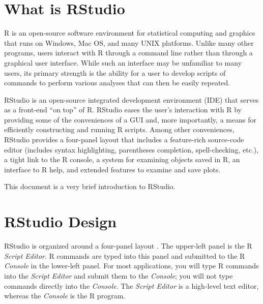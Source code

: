 \documentclass{article}\usepackage[]{graphicx}\usepackage[]{color}
\begin{document}
\section{What is RStudio}
\vspace{-12pt}
R is an open-source software environment for statistical computing and graphics that runs on Windows, Mac OS, and many UNIX platforms.  Unlike many other programs, users interact with R through a command line rather than through a graphical user interface.    While such an interface may be unfamiliar to many users, its primary strength is the ability for a user to develop scripts of commands to perform various analyses that can then be easily repeated.

RStudio is an open-source integrated development environment (IDE) that serves as a front-end ``on top'' of R.  RStudio eases the user's interaction with R by providing some of the conveniences of a GUI and, more importantly, a means for efficiently constructing and running R scripts.  Among other conveniences, RStudio provides a four-panel layout that includes a feature-rich source-code editor (includes syntax highlighting, parentheses completion, spell-checking, etc.), a tight link to the R console, a system for examining objects saved in R, an interface to R help, and extended features to examine and save plots.

This document is a very brief introduction to RStudio.


\section{RStudio Design}
\vspace{-12pt}
RStudio is organized around a four-panel layout .  The upper-left panel is the R \textit{Script Editor}.  R commands are typed into this panel and submitted to the R \textit{Console} in the lower-left panel.  For most applications, you will type R commands into the \textit{Script Editor} and submit them to the \textit{Console}; you will not type commands directly into the \textit{Console}.  The \textit{Script Editor} is a high-level text editor, whereas the \textit{Console} is the R program.
\end{document}
